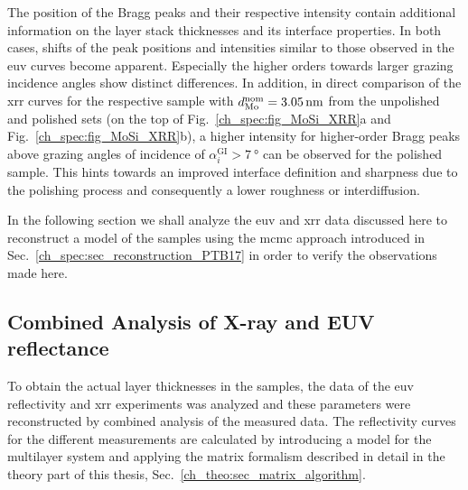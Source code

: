 The position of the Bragg peaks and their respective intensity contain additional information on the layer stack thicknesses and its interface properties. In both cases, shifts of the peak positions and intensities similar to those observed in the \gls{euv} curves become apparent. Especially the higher orders towards larger grazing incidence angles show distinct differences. In addition, in direct comparison of the \gls{xrr} curves for the respective sample with $d_\text{Mo}^\text{nom} = \nm{3.05}$ from the unpolished and polished sets (on the top of Fig.~\ref{ch_spec:fig_MoSi_XRR}a and Fig.~\ref{ch_spec:fig_MoSi_XRR}b), a higher intensity for higher-order Bragg peaks above grazing angles of incidence of $\alpha_i^\text{GI} > \SI{7}{\degree}$ can be observed for the polished sample. This hints towards an improved interface definition and sharpness due to the polishing process and consequently a lower roughness or interdiffusion.

In the following section we shall analyze the \gls{euv} and \gls{xrr} data discussed here to reconstruct a model of the samples using the \gls{mcmc} approach introduced in Sec.~\ref{ch_spec:sec_reconstruction_PTB17} in order to verify the observations made here.

\subsection{Combined Analysis of X-ray and EUV reflectance} \label{ch_spec:sec_MoSi_euv_xrr_combined}
To obtain the actual layer thicknesses in the samples, the data of the \gls{euv} reflectivity and \gls{xrr} experiments was analyzed and these parameters were reconstructed by combined analysis of the measured data. The reflectivity curves for the different measurements are calculated by introducing a model for the multilayer system and applying the matrix formalism described in detail in the theory part of this thesis, Sec.~\ref{ch_theo:sec_matrix_algorithm}.

